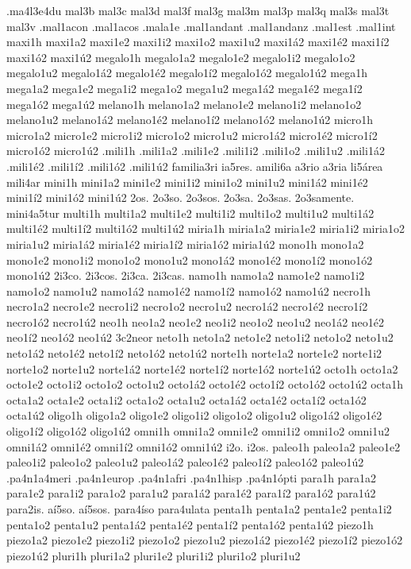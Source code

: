{.ma4l3e4du
mal3b
mal3c
mal3d
mal3f
mal3g
mal3m
mal3p
mal3q
mal3s
mal3t
mal3v
.mal1acon
.mal1acos
.mala1e
.mal1andant
.mal1andanz
.mal1est
.mal1int
maxi1h
maxi1a2 maxi1e2 maxi1i2 maxi1o2 maxi1u2
maxi1á2 maxi1é2 maxi1í2 maxi1ó2 maxi1ú2
megalo1h
megalo1a2 megalo1e2 megalo1i2 megalo1o2 megalo1u2
megalo1á2 megalo1é2 megalo1í2 megalo1ó2 megalo1ú2
mega1h
mega1a2 mega1e2 mega1i2 mega1o2 mega1u2
mega1á2 mega1é2 mega1í2 mega1ó2 mega1ú2
melano1h
melano1a2 melano1e2 melano1i2 melano1o2 melano1u2
melano1á2 melano1é2 melano1í2 melano1ó2 melano1ú2
micro1h
micro1a2 micro1e2 micro1i2 micro1o2 micro1u2
micro1á2 micro1é2 micro1í2 micro1ó2 micro1ú2
.mili1h
.mili1a2 .mili1e2 .mili1i2 .mili1o2 .mili1u2
.mili1á2 .mili1é2 .mili1í2 .mili1ó2 .mili1ú2
familia3ri
ia5res.
amili6a
a3rio
a3ria
li5área
mili4ar
mini1h
mini1a2 mini1e2 mini1i2 mini1o2 mini1u2
mini1á2 mini1é2 mini1í2 mini1ó2 mini1ú2
2os.
2o3so.
2o3sos.
2o3sa.
2o3sas.
2o3samente.
mini4a5tur
multi1h
multi1a2 multi1e2 multi1i2 multi1o2 multi1u2
multi1á2 multi1é2 multi1í2 multi1ó2 multi1ú2
miria1h
miria1a2 miria1e2 miria1i2 miria1o2 miria1u2
miria1á2 miria1é2 miria1í2 miria1ó2 miria1ú2
mono1h
mono1a2 mono1e2 mono1i2 mono1o2 mono1u2
mono1á2 mono1é2 mono1í2 mono1ó2 mono1ú2
2i3co.
2i3cos.
2i3ca.
2i3cas.
namo1h
namo1a2 namo1e2 namo1i2 namo1o2 namo1u2
namo1á2 namo1é2 namo1í2 namo1ó2 namo1ú2
necro1h
necro1a2 necro1e2 necro1i2 necro1o2 necro1u2
necro1á2 necro1é2 necro1í2 necro1ó2 necro1ú2
neo1h
neo1a2 neo1e2 neo1i2 neo1o2 neo1u2
neo1á2 neo1é2 neo1í2 neo1ó2 neo1ú2
3c2neor
neto1h
neto1a2 neto1e2 neto1i2 neto1o2 neto1u2
neto1á2 neto1é2 neto1í2 neto1ó2 neto1ú2
norte1h
norte1a2 norte1e2 norte1i2 norte1o2 norte1u2
norte1á2 norte1é2 norte1í2 norte1ó2 norte1ú2
octo1h
octo1a2 octo1e2 octo1i2 octo1o2 octo1u2
octo1á2 octo1é2 octo1í2 octo1ó2 octo1ú2
octa1h
octa1a2 octa1e2 octa1i2 octa1o2 octa1u2
octa1á2 octa1é2 octa1í2 octa1ó2 octa1ú2
oligo1h
oligo1a2 oligo1e2 oligo1i2 oligo1o2 oligo1u2
oligo1á2 oligo1é2 oligo1í2 oligo1ó2 oligo1ú2
omni1h
omni1a2 omni1e2 omni1i2 omni1o2 omni1u2
omni1á2 omni1é2 omni1í2 omni1ó2 omni1ú2
i2o.
i2os.
paleo1h
paleo1a2 paleo1e2 paleo1i2 paleo1o2 paleo1u2
paleo1á2 paleo1é2 paleo1í2 paleo1ó2 paleo1ú2
.pa4n1a4meri
.pa4n1europ
.pa4n1afri
.pa4n1hisp
.pa4n1ópti
para1h
para1a2 para1e2 para1i2 para1o2 para1u2
para1á2 para1é2 para1í2 para1ó2 para1ú2
para2is.
aí5so.
aí5sos.
para4íso
para4ulata
penta1h
penta1a2 penta1e2 penta1i2 penta1o2 penta1u2
penta1á2 penta1é2 penta1í2 penta1ó2 penta1ú2
piezo1h
piezo1a2 piezo1e2 piezo1i2 piezo1o2 piezo1u2
piezo1á2 piezo1é2 piezo1í2 piezo1ó2 piezo1ú2
pluri1h
pluri1a2 pluri1e2 pluri1i2 pluri1o2 pluri1u2
}
